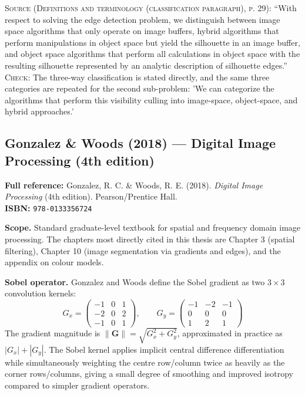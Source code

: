 \documentclass[11pt, a4paper]{article}
\begin{document}
\begin{itemize}[leftmargin=1.2em,itemsep=4pt]
\textsc{Source (Definitions and terminology (classification paragraph), p. 29):} ``With respect to solving the edge detection problem, we distinguish between image space algorithms that only operate on image buffers, hybrid algorithms that perform manipulations in object space but yield the silhouette in an image buffer, and object space algorithms that perform all calculations in object space with the resulting silhouette represented by an analytic description of silhouette edges.''\\
\textsc{Check:} The three-way classification is stated directly, and the same three categories are repeated for the second sub-problem: 'We can categorize the algorithms that perform this visibility culling into image-space, object-space, and hybrid approaches.'
\end{itemize}

\vspace{8pt}
\subsection{Gonzalez \& Woods (2018) --- Digital Image Processing (4th edition)}

\begin{refbox}
\textbf{Full reference:} Gonzalez, R. C. \& Woods, R. E. (2018). \textit{Digital Image Processing} (4th edition). Pearson/Prentice Hall.\\[4pt]
\textbf{ISBN:} \texttt{978-0133356724}
\end{refbox}

\textbf{Scope.} Standard graduate-level textbook for spatial and frequency domain image processing. The chapters most directly cited in this thesis are Chapter 3 (spatial filtering), Chapter 10 (image segmentation via gradients and edges), and the appendix on colour models.

\textbf{Sobel operator.} Gonzalez and Woods define the Sobel gradient as two $3\times3$ convolution kernels:
\[
  G_x = \begin{pmatrix} -1 & 0 & 1 \\ -2 & 0 & 2 \\ -1 & 0 & 1 \end{pmatrix}, \qquad
  G_y = \begin{pmatrix} -1 & -2 & -1 \\ 0 & 0 & 0 \\ 1 & 2 & 1 \end{pmatrix}
\]
The gradient magnitude is $\|\mathbf{G}\| = \sqrt{G_x^2 + G_y^2}$, approximated in practice as $|G_x| + |G_y|$. The Sobel kernel applies implicit central difference differentiation while simultaneously weighting the centre row/column twice as heavily as the corner rows/columns, giving a small degree of smoothing and improved isotropy compared to simpler gradient operators.
\end{document}
